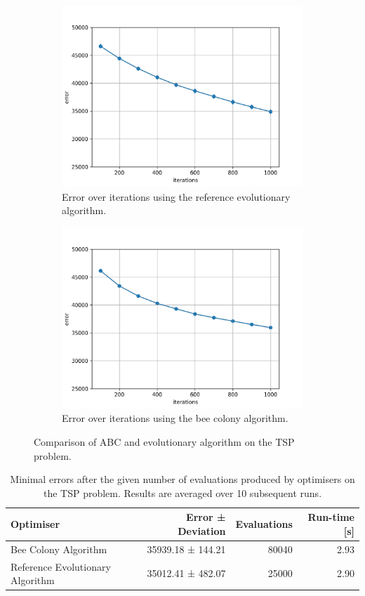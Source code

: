 \begin{figure}[h]
	\centering
	\begin{subfigure}{.5\textwidth}
		\centering
		\captionsetup{width=0.75\linewidth}
		\includegraphics[width=0.75\linewidth]{assets/reference_tsp.png}
		\caption{Error over iterations using the reference evolutionary algorithm.}
		\label{fig:reference_tsp}
	\end{subfigure}%
	\begin{subfigure}{.5\textwidth}
		\centering
    \captionsetup{width=0.75\linewidth}
		\includegraphics[width=0.75\linewidth]{assets/beecolony_tsp.png}
		\caption{Error over iterations using the bee colony algorithm.}
		\label{fig:becolony_tsp}
	\end{subfigure}
	\caption{Comparison of ABC and evolutionary algorithm on the TSP problem.}
	\label{fig:bee_vs_ea}
\end{figure}

\begin{table}[H]
	\centering
	\begin{tabular}{|l r r r|}
		\hline
		\textbf{Optimiser} & \textbf{Error ± Deviation} & \textbf{Evaluations} & \textbf{Run-time [s]} \\
		\hline
		Bee Colony Algorithm & 35939.18 ± 144.21 & 80040 & 2.93 \\
		Reference Evolutionary Algorithm & 35012.41 ± 482.07 & 25000 & 2.90 \\
		\hline
	\end{tabular}
	\caption{Minimal errors after the given number of evaluations produced by optimisers on the TSP problem. Results are averaged over 10 subsequent runs.}
	\label{tab:bee_vs_ea}
\end{table}
